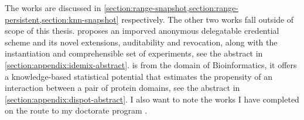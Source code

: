			The works \cite{ore-benchmark-17,epsolute,k-anon} are discussed in \cref{section:range-snapshot,section:range-persistent,section:knn-snapshot} respectively.
			The other two works \cite{bogatov-idemix-2020,dispot} fall outside of scope of this thesis.
			\cite{bogatov-idemix-2020} proposes an imporved anonymous delegatable credential scheme and its novel extensions, auditability and revocation, along with the instantiation and comprehensible set of experiments, see the abstract in \cref{section:appendix:idemix-abstract}.
			\cite{dispot} is from the domain of Bioinformatics, it offers a knowledge-based statistical potential that estimates the propensity of an interaction between a pair of protein domains, see the abstract in \cref{section:appendix:dispot-abstract}.
			I also want to note the works I have completed on the route to my doctorate program \cite{bogatov-ipe-journal-2017,bogatov-wpi-library-2016,nurbekov-wpi-library-2015}.

